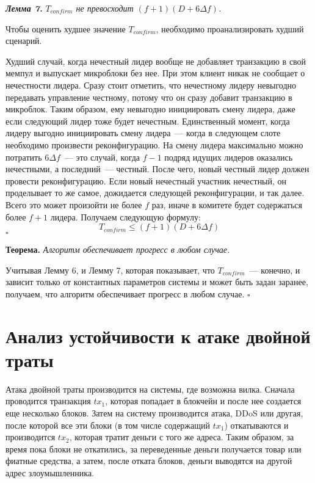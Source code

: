 
\textbf{\textit{Лемма 7.}}  \textit{$T_{confirm}$ не превосходит $(f+1)(D+6\Delta f)$.}

Чтобы оценить худшее значение $T_{confirm}$, необходимо проанализировать худший сценарий.

Худший случай, когда нечестный лидер вообще не добавляет транзакцию в свой мемпул и выпускает микроблоки без нее. При этом клиент никак не сообщает о нечестности лидера. Сразу стоит отметить, что нечестному лидеру невыгодно передавать управление честному, потому что он сразу добавит транзакцию в микроблок. Таким образом, ему невыгодно инициировать смену лидера, даже если следующий лидер тоже будет нечестным. Единственный  момент, когда лидеру выгодно инициировать смену лидера~--- когда в следующем слоте необходимо произвести реконфигурацию. На смену лидера максимально можно потратить $6\Delta f$~--- это случай, когда $f-1$ подряд идущих лидеров оказались нечестными, а последний~--- честный.
После чего, новый честный лидер должен провести реконфигурацию. Если новый нечестный участник нечестный, он проделывает то же самое, дожидается следующей реконфигурации, и так далее. Всего это может произойти не более $f$ раз, иначе в комитете будет содержаться более $f+1$ лидера. Получаем следующую формулу:
$$ T_{confirm} \le (f+1)(D+6\Delta f)$$ $\square$

\textbf{Теорема.} \textit{Алгоритм обеспечивает прогресс в любом случае.}

Учитывая Лемму 6, и Лемму 7, которая показывает, что $T_{confirm}$~--- конечно, и зависит только от константных параметров системы и может быть задан заранее, получаем, что алгоритм обеспечивает прогресс в любом случае. $\square$




\section{Анализ устойчивости к атаке двойной траты}
Атака двойной траты производится на системы, где возможна вилка. Сначала проводится транзакция $tx_1$, которая попадает в блокчейн и после нее создается еще несколько блоков. Затем на систему производится атака, DDoS или другая, после которой все эти блоки (в том числе содержащий $tx_1$) откатываются и производится $tx_2$, которая тратит деньги с того же адреса. Таким образом, за время пока блоки не откатились, за переведенные деньги получается товар или фиатные средства, а затем, после отката блоков, деньги выводятся на другой адрес злоумышленника.

